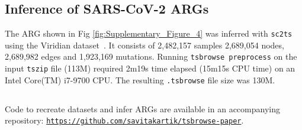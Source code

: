 \documentclass[unnumsec,webpdf,contemporary,large,namedate]{oup-authoring-template}%
\begin{document}
\subsection{Inference of SARS-CoV-2 ARGs}
The ARG shown in Fig \ref{fig:Supplementary_Figure_4} was inferred with
\texttt{sc2ts}~\citep{zhang2023biobank} using the Viridian
dataset~\citep{hunt2024addressing}. It consists of
2,482,157 samples
2,689,054 nodes,
2,689,982 edges
and
1,923,169 mutations.
Running \texttt{tsbrowse preprocess} on the input \texttt{tszip} file (113M)
required 2m19s time elapsed (15m15s CPU time) on an Intel Core(TM) i7-9700 CPU.
The resulting \texttt{.tsbrowse} file size was 130M.


\subsection{} Code to recreate datasets and infer ARGs are available in an
accompanying repository:
\texttt{\url{https://github.com/savitakartik/tsbrowse-paper}}.

\clearpage
\end{document}
